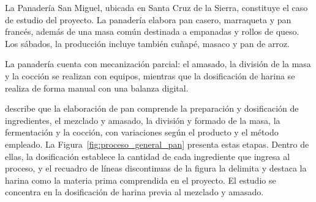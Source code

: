 % 

La Panadería San Miguel, ubicada en Santa Cruz de la Sierra, constituye el
caso de estudio del proyecto.
La panadería elabora pan casero, marraqueta y pan francés, además de una masa
común destinada a empanadas y rollos de queso. Los sábados, la producción
incluye también cuñapé, masaco y pan de arroz.

La panadería cuenta con mecanización parcial: el amasado, la división de la
masa y la cocción se realizan con equipos, mientras que la dosificación de
harina se realiza de forma manual con una balanza digital.

\textcite{cauvain2015technology} describe que la elaboración de pan
comprende la preparación y dosificación de ingredientes, el mezclado y
amasado, la división y formado de la masa, la fermentación y la cocción, con
variaciones según el producto y el método empleado. La
Figura~\ref{fig:proceso_general_pan} presenta estas etapas. Dentro de ellas,
la dosificación establece la cantidad de cada ingrediente que ingresa al
proceso, y el recuadro de líneas discontinuas de la figura la delimita y
destaca la harina como la materia prima comprendida en el proyecto. El
estudio se concentra en la dosificación de harina previa al mezclado y
amasado.

